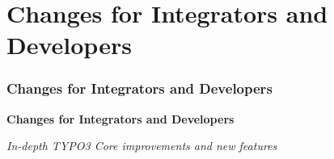 %

\section{Changes for Integrators and Developers}
\begin{frame}[fragile]
	\frametitle{Changes for Integrators and Developers}

	\begin{center}\huge{\color{typo3darkgrey}\textbf{Changes for Integrators and Developers}}\end{center}
	\begin{center}\large{\textit{In-depth TYPO3 Core improvements and new features}}\end{center}

\end{frame}


